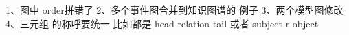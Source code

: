 1、图中 order拼错了
2、多个事件图合并到知识图谱的 例子
3、两个模型图修改
4、三元组 的称呼要统一  比如都是 head relation tail 或者 subject r object
